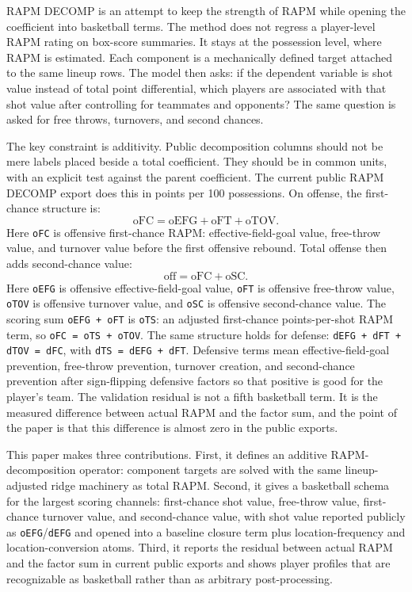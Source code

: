 \documentclass[11pt]{article}
\begin{document}
RAPM DECOMP is an attempt to keep the strength of RAPM while opening the
coefficient into basketball terms.  The method does not regress a player-level
RAPM rating on box-score summaries.  It stays at the possession level, where
RAPM is estimated.  Each component is a mechanically defined target attached to
the same lineup rows.  The model then asks: if the dependent variable is shot
value instead of total point differential, which players are associated with
that shot value after controlling for teammates and opponents?  The same
question is asked for free throws, turnovers, and second chances.

The key constraint is additivity.  Public decomposition columns should not be
mere labels placed beside a total coefficient.  They should be in common units,
with an explicit test against the parent coefficient.  The current public RAPM
DECOMP export does this in points per 100 possessions.  On offense, the
first-chance structure is:
\[
\text{oFC}
= \text{oEFG}
+ \text{oFT}
+ \text{oTOV}.
\]
Here \texttt{oFC} is offensive first-chance RAPM: effective-field-goal value,
free-throw value, and turnover value before the first offensive rebound.  Total
offense then adds second-chance value:
\[
\text{off}
= \text{oFC}
+ \text{oSC}.
\]
Here \texttt{oEFG} is offensive effective-field-goal value, \texttt{oFT} is
offensive free-throw value, \texttt{oTOV} is offensive turnover value, and
\texttt{oSC} is offensive second-chance value.  The scoring sum
\texttt{oEFG + oFT} is \texttt{oTS}: an adjusted first-chance points-per-shot
RAPM term, so \texttt{oFC = oTS + oTOV}.  The same structure holds for defense:
\texttt{dEFG + dFT + dTOV = dFC}, with \texttt{dTS = dEFG + dFT}.  Defensive
terms mean effective-field-goal prevention, free-throw prevention, turnover
creation, and second-chance prevention after sign-flipping defensive factors so
that positive is good for the player's team.  The validation residual is not a
fifth basketball term.  It is the measured difference between actual RAPM and
the factor sum, and the point of the paper is that this difference is
almost zero in the public exports.

This paper makes three contributions.  First, it defines an additive
RAPM-decomposition operator: component targets are solved with the same
lineup-adjusted ridge machinery as total RAPM.  Second, it gives a basketball
schema for the largest scoring channels: first-chance shot value, free-throw
value, first-chance turnover value, and second-chance value, with shot value
reported publicly as \texttt{oEFG}/\texttt{dEFG} and opened into a baseline
closure term plus location-frequency and location-conversion atoms.  Third, it
reports
the residual between actual RAPM and the factor sum in current public exports
and shows player profiles that are recognizable as basketball rather than as
arbitrary post-processing.
\end{document}

